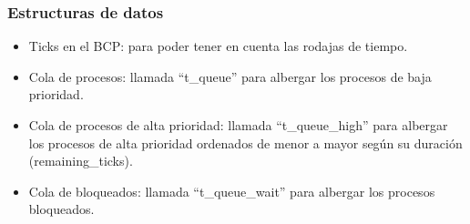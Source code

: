 \documentclass[10pt, spanish, pdftex]{template/UC3M_document}
\begin{document}
\subsubsection{Estructuras de datos}
\vspace{-2mm}
    \begin{itemize}
     \setlength{\itemsep}{-1.5mm}
    \item Ticks en el BCP: para poder tener en cuenta las rodajas de tiempo.
    \item Cola de procesos: llamada “t\_queue” para albergar los procesos de baja prioridad.
    \item Cola de procesos de alta prioridad: llamada “t\_queue\_high” para albergar los procesos de alta prioridad ordenados de menor a mayor según su duración (remaining\_ticks).
    \item Cola de bloqueados: llamada “t\_queue\_wait” para albergar los procesos bloqueados.
\end{itemize}
\end{document}
